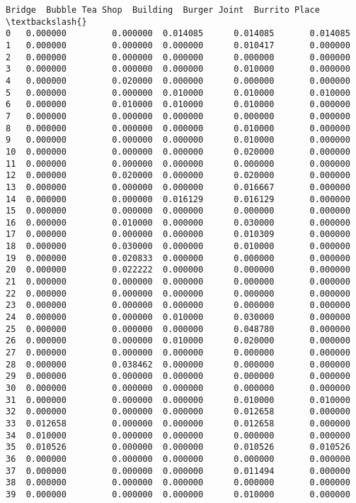 \documentclass[11pt]{article}
\begin{document}
\begin{tcolorbox}[breakable, size=fbox, boxrule=.5pt, pad at break*=1mm, opacityfill=0]
\begin{Verbatim}[commandchars=\\\{\}]
      Bridge  Bubble Tea Shop  Building  Burger Joint  Burrito Place  \textbackslash{}
0   0.000000         0.000000  0.014085      0.014085       0.014085
1   0.000000         0.000000  0.000000      0.010417       0.000000
2   0.000000         0.000000  0.000000      0.000000       0.000000
3   0.000000         0.000000  0.000000      0.010000       0.000000
4   0.000000         0.020000  0.000000      0.000000       0.000000
5   0.000000         0.000000  0.010000      0.010000       0.010000
6   0.000000         0.010000  0.010000      0.010000       0.000000
7   0.000000         0.000000  0.000000      0.000000       0.000000
8   0.000000         0.000000  0.000000      0.010000       0.000000
9   0.000000         0.000000  0.000000      0.010000       0.000000
10  0.000000         0.000000  0.000000      0.020000       0.000000
11  0.000000         0.000000  0.000000      0.000000       0.000000
12  0.000000         0.020000  0.000000      0.020000       0.000000
13  0.000000         0.000000  0.000000      0.016667       0.000000
14  0.000000         0.000000  0.016129      0.016129       0.000000
15  0.000000         0.000000  0.000000      0.000000       0.000000
16  0.000000         0.010000  0.000000      0.030000       0.000000
17  0.000000         0.000000  0.000000      0.010309       0.000000
18  0.000000         0.030000  0.000000      0.010000       0.000000
19  0.000000         0.020833  0.000000      0.000000       0.000000
20  0.000000         0.022222  0.000000      0.000000       0.000000
21  0.000000         0.000000  0.000000      0.000000       0.000000
22  0.000000         0.000000  0.000000      0.000000       0.000000
23  0.000000         0.000000  0.000000      0.000000       0.000000
24  0.000000         0.000000  0.010000      0.030000       0.000000
25  0.000000         0.000000  0.000000      0.048780       0.000000
26  0.000000         0.000000  0.010000      0.020000       0.000000
27  0.000000         0.000000  0.000000      0.000000       0.000000
28  0.000000         0.038462  0.000000      0.000000       0.000000
29  0.000000         0.000000  0.000000      0.000000       0.000000
30  0.000000         0.000000  0.000000      0.000000       0.000000
31  0.000000         0.000000  0.000000      0.010000       0.010000
32  0.000000         0.000000  0.000000      0.012658       0.000000
33  0.012658         0.000000  0.000000      0.012658       0.000000
34  0.010000         0.000000  0.000000      0.000000       0.000000
35  0.010526         0.000000  0.000000      0.010526       0.010526
36  0.000000         0.000000  0.000000      0.000000       0.000000
37  0.000000         0.000000  0.000000      0.011494       0.000000
38  0.000000         0.000000  0.000000      0.000000       0.000000
39  0.000000         0.000000  0.000000      0.010000       0.000000


\end{Verbatim}
\end{tcolorbox}
\end{document}
